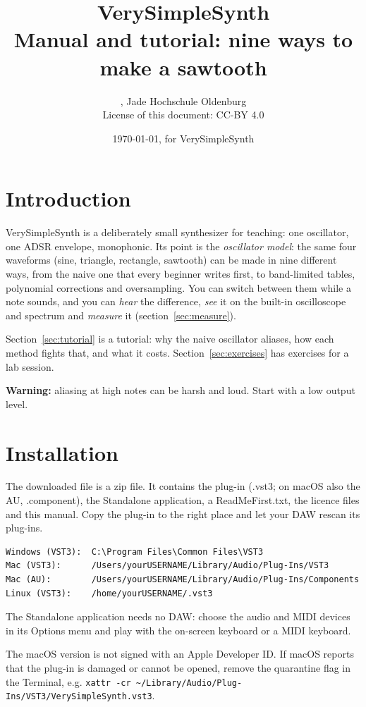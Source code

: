 \documentclass[11pt]{article}
\title{VerySimpleSynth\\[1ex]\large Manual and tutorial: nine ways to make a sawtooth}
\author{\pluginauthor, Jade Hochschule Oldenburg\\License of this document: CC-BY 4.0}
\date{\today, for VerySimpleSynth \pluginversion}
\begin{document}
\maketitle

\tableofcontents

\section{Introduction}
VerySimpleSynth is a deliberately small synthesizer for teaching: one oscillator, one ADSR envelope,
monophonic. Its point is the \emph{oscillator model}: the same four waveforms (sine, triangle,
rectangle, sawtooth) can be made in nine different ways, from the naive one that every beginner
writes first, to band-limited tables, polynomial corrections and oversampling. You can switch
between them while a note sounds, and you can \emph{hear} the difference, \emph{see} it on the
built-in oscilloscope and spectrum and \emph{measure} it (section~\ref{sec:measure}).

Section~\ref{sec:tutorial} is a tutorial: why the naive oscillator aliases, how each method fights
that, and what it costs. Section~\ref{sec:exercises} has exercises for a lab session.

\textbf{Warning:} aliasing at high notes can be harsh and loud. Start with a low output level.

\section{Installation}
The downloaded file is a zip file. It contains the plug-in (.vst3; on macOS also the AU,
.component), the Standalone application, a ReadMeFirst.txt, the licence files and this manual.
Copy the plug-in to the right place and let your DAW rescan its plug-ins.

\begin{verbatim}
Windows (VST3):  C:\Program Files\Common Files\VST3
Mac (VST3):      /Users/yourUSERNAME/Library/Audio/Plug-Ins/VST3
Mac (AU):        /Users/yourUSERNAME/Library/Audio/Plug-Ins/Components
Linux (VST3):    /home/yourUSERNAME/.vst3
\end{verbatim}

The Standalone application needs no DAW: choose the audio and MIDI devices in its Options menu and
play with the on-screen keyboard or a MIDI keyboard.

The macOS version is not signed with an Apple Developer ID. If macOS reports that the plug-in
is damaged or cannot be opened, remove the quarantine flag in the Terminal, e.g.
\texttt{xattr -cr \textasciitilde/Library/Audio/Plug-Ins/VST3/VerySimpleSynth.vst3}.
\end{document}
